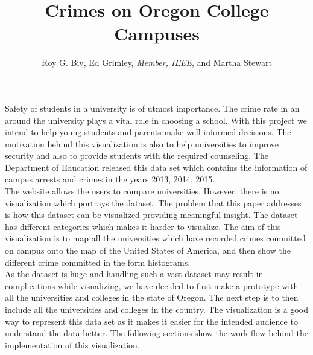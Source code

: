 \documentclass[journal]{vgtc}                %
\title{Crimes on Oregon College Campuses}
\author{Roy G. Biv, Ed Grimley, \textit{Member, IEEE}, and Martha Stewart}
\begin{document}


\maketitle

Safety of students in a university is of utmost importance. The crime rate in an around the university plays a vital role in choosing a school. With this project we intend to help young students and parents make well informed decisions. The motivation behind this visualization is also to help universities to improve security and also to provide students with the required counseling. The Department of Education released this data set which contains the information of campus arrests and crimes in the years 2013, 2014, 2015.\\
The website allows the users to compare universities. However, there is no visualization which portrays the dataset. The problem that this paper addresses is how this dataset can be visualized providing meaningful insight. The dataset has different categories which makes it harder to visualize. The aim of this visualization is to map all the universities which have recorded crimes committed on campus onto the map of the United States of America, and then show the different crime committed in the form histograms.\\
As the dataset is huge and handling such a vast dataset may result in complications while visualizing, we have decided to first make a prototype with all the universities and colleges in the state of Oregon. The next step is to then include all the universities and colleges in the country. The visualization is a good way to represent this data set as it makes it easier for the intended audience to understand the data better. The following sections show the work flow behind the implementation of this visualization.\\
\end{document}
